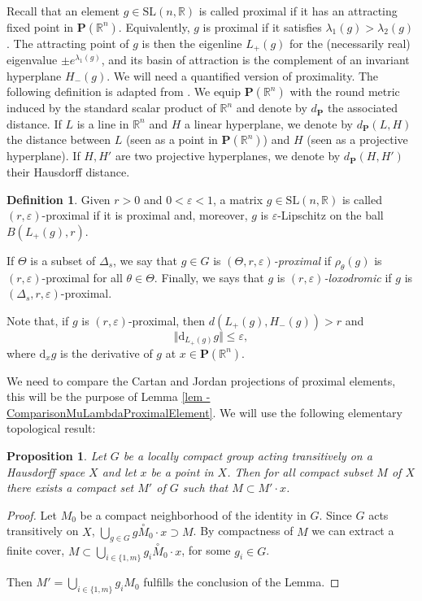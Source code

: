 \documentclass[11pt]{article}
\numberwithin{equation}{section}
\newtheorem{prop}[theo]{Proposition}
\theoremstyle{definition}
\newtheorem{defi}[theo]{Definition}
\newcommand{\proj}{\mathbf{P}}
\newcommand{\R}{\mathbb{R}}
\newcommand{\SL}{\mathrm{SL}}
\let\epsilon\varepsilon
\begin{document}
Recall that an element $g\in \SL(n,\R)$ is called proximal if it has an attracting fixed point in $\proj(\R^n)$. Equivalently, $g$ is proximal if it satisfies $\lambda_1(g)> \lambda_2(g)$. The attracting point of $g$ is then the eigenline $L_+(g)$ for the (necessarily real) eigenvalue $\pm e^{\lambda_1(g)}$, and its basin of attraction is the complement of an invariant hyperplane $H_-(g)$. We will need a quantified version of proximality. The following definition is adapted from \cite[Def.\,5.6]{guichard2012anosov}. We equip $\proj(\R^n)$ with the round metric induced by the standard scalar product of $\R^n$ and denote by $d_\proj$ the associated distance. If $L$ is a line in $\R^n$ and $H$ a linear hyperplane, we denote by $d_\proj(L,H)$ the distance between $L$ (seen as a point in $\proj (\R^n)$) and $H$ (seen as a projective hyperplane). If $H,H'$ are two projective hyperplanes, we denote by $d_\proj(H,H')$ their Hausdorff distance.

\begin{defi} \label{def - proximality}
Given $r>0$ and $0<\epsilon<1$, a matrix $g\in \SL(n,\R)$ is called $(r,\epsilon)$\nobreakdash-prox\-imal if it is proximal and, moreover, $g$ is $\epsilon$-Lipschitz on the ball $B(L_+(g),r)$.

If $\Theta$ is a subset of $\Delta_s$, we say that $g\in G$ is \emph{$(\Theta,r,\epsilon)$\nobreakdash-prox\-imal} if $\rho_\theta(g)$ is $(r,\epsilon)$\nobreakdash-prox\-imal for all $\theta\in \Theta$. Finally, we says that $g$ is \emph{$(r,\epsilon)$-loxodromic} if $g$ is $(\Delta_s,r,\epsilon)$\nobreakdash-prox\-imal.
\end{defi}

Note that, if $g$ is $(r,\epsilon)$-proximal, then $d(L_+(g),H_-(g)) >r$ and
\[\Vert \mathrm d_{L_+(g)}g\Vert \leq \epsilon,\]
where $\mathrm d_xg$ is the derivative of $g$ at $x\in \mathbf P(\R^n)$.

We need to compare the Cartan and Jordan projections of proximal elements, this will be the purpose of Lemma \ref{lem - ComparisonMuLambdaProximalElement}. We will use the following elementary topological result:
\begin{prop}\label{lem- compactity of loc compact transitive action}
Let $G$ be a locally compact group acting transitively on a Hausdorff space $X$ and let $x$ be a point in $X$. Then for all compact subset $M$ of $X$ there exists a compact set $M'$ of $G$ such that
$M\subset M' \cdot x $.
\end{prop}

\begin{proof}
Let $M_0$ be a compact neighborhood of the identity in $G$. Since $G$ acts transitively on $X$, $\bigcup_{g\in G} g\overset{\circ}{M}_0 \cdot x \supset M$. By compactness of $M$ we can extract a finite cover, $M\subset \bigcup_{i\in \{1, m\}} g_i \overset{\circ}{M}_0 \cdot x $, for some $g_i \in G$.

Then $M' = \bigcup_{i\in \{1, m\}} g_i M_0$ fulfills the conclusion of the Lemma.
\end{proof}
\end{document}

